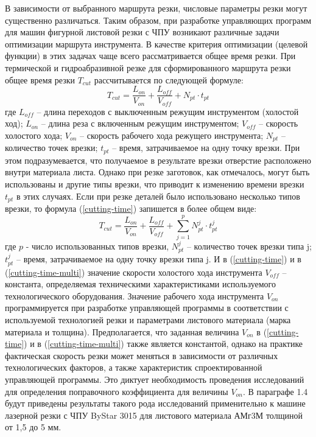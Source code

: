 \documentclass{article}
\begin{document}
В зависимости от выбранного маршрута резки,
числовые параметры резки могут существенно различаться.
Таким образом, при разработке управляющих программ
для машин фигурной листовой резки с ЧПУ возникают
различные задачи оптимизации маршрута инструмента.
В качестве критерия оптимизации (целевой функции)
в этих задачах чаще всего рассматривается общее время резки.
При термической и гидроабразивной резке для сформированного
маршрута резки общее время резки
$T_{cut}$
рассчитывается по следующей формуле:
\begin{equation}
  T_{cut} = \frac{L_{on}}{V_{on}} + \frac{L_{off}}{V_{off}} +N_{pt} \cdot t_{pt}
  \label{cutting-time}
\end{equation}
где
$L_{off}$ – длина переходов с выключенным режущим инструментом (холостой ход);
$L_{on}$ – длина реза с включенным режущим инструментом;
$V_{off}$ – скорость холостого хода;
$V_{on}$ – скорость рабочего хода режущего инструмента;
$N_{pt}$ – количество точек врезки;
$t_{pt}$ – время, затрачиваемое на одну точку врезки.
При этом подразумевается,
что получаемое в результате врезки отверстие
расположено внутри материала листа.
Однако при резке заготовок, как отмечалось,
могут быть использованы и другие типы врезки,
что приводит к изменению времени врезки
$t_{pt}$
в этих случаях.
Если при резке деталей было использовано несколько типов врезки,
то формула (\ref{cutting-time}) запишется в более общем виде:
\begin{equation}
  T_{cut} = \frac{L_{on}}{V_{on}} + \frac{L_{off}}{V_{off}} +
  \sum_{j=1}^p N_{pt}^j \cdot t_{pt}^j
  \label{cutting-time-multi}
\end{equation}
где
$p$ - число использованных типов врезки,
$N_{pt}^j$ – количество точек врезки типа j;
$t_{pt}^j$ – время, затрачиваемое на одну точку врезки типа j.
И в (\ref{cutting-time}) и в (\ref{cutting-time-multi})
значение скорости холостого хода инструмента
$V_{off}$ – константа,
определяемая техническими характеристиками
используемого технологического оборудования.
Значение рабочего хода инструмента
$V_{on}$
программируется при разработке управляющей программы
в соответствии с используемой технологией резки
и параметрами листового материала
(марка материала и толщина).
Предполагается, что заданная величина
$V_{on}$  в (\ref{cutting-time}) и в (\ref{cutting-time-multi})
также является константой,
однако на практике фактическая скорость резки
может меняться в зависимости от различных технологических факторов,
а также характеристик спроектированной управляющей программы.
Это диктует необходимость проведения исследований для
определения поправочного коэффициента для величины
$V_{on}$.
В параграфе 1.4
будут приведены результаты такого рода исследований
применительно к машине лазерной резки с ЧПУ
ByStar 3015 для листового материала АМг3М толщиной от 1,5 до 5 мм.
\end{document}
